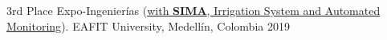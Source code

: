
\begin{cvhonors}

  \cvhonor
    {3rd Place} %
    {Expo-Ingenierías (\href{https://github.com/Youngermaster/Irrigation-System}{with \textbf{SIMA}, Irrigation System and Automated Monitoring}).} %
    {EAFIT University, Medellín, Colombia} %
    {2019} %
\end{cvhonors}
